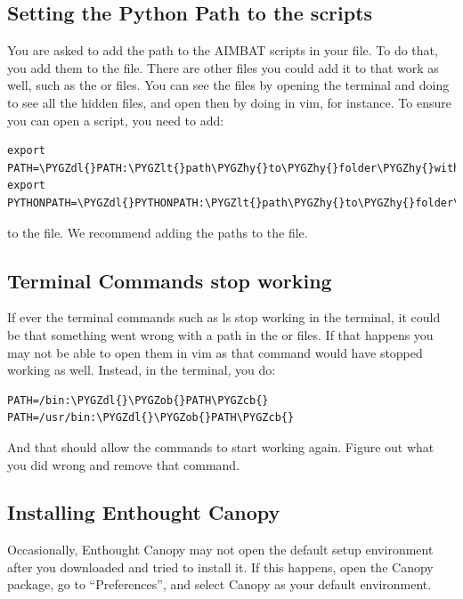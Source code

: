 \documentclass[letterpaper,10pt,english]{sphinxmanual}
\def\PYGZob{\char`\{}
\def\PYGZcb{\char`\}}
\def\PYGZlt{\char`\<}
\def\PYGZgt{\char`\>}
\def\PYGZdl{\char`\$}
\def\PYGZhy{\char`\-}
\begin{document}
\subsection{Setting the Python Path to the scripts}
\label{docfiles/install_dependencies:setting-the-python-path-to-the-scripts}
You are asked to add the path to the AIMBAT scripts in your file. To do that, you add them to the  file. There are other files you could add it to that work as well, such as the  or  files. You can see the files by opening the terminal and doing  to see all the hidden files, and open then by doing  in vim, for instance.
To ensure you can open a script, you need to add:

\begin{Verbatim}[commandchars=\\\{\}]
export PATH=\PYGZdl{}PATH:\PYGZlt{}path\PYGZhy{}to\PYGZhy{}folder\PYGZhy{}with\PYGZhy{}scripts\PYGZgt{}
export PYTHONPATH=\PYGZdl{}PYTHONPATH:\PYGZlt{}path\PYGZhy{}to\PYGZhy{}folder\PYGZhy{}with\PYGZhy{}scripts\PYGZgt{}
\end{Verbatim}

to the  file. We recommend adding the paths to the  file.


\subsection{Terminal Commands stop working}
\label{docfiles/install_dependencies:terminal-commands-stop-working}
If ever the terminal commands such as ls stop working in the terminal, it could be that something went wrong with a path in the  or  files. If that happens you may not be able to open them in vim as that command would have stopped working as well. Instead, in the terminal, you do:

\begin{Verbatim}[commandchars=\\\{\}]
PATH=/bin:\PYGZdl{}\PYGZob{}PATH\PYGZcb{}
PATH=/usr/bin:\PYGZdl{}\PYGZob{}PATH\PYGZcb{}
\end{Verbatim}

And that should allow the commands to start working again. Figure out what you did wrong and remove that command.


\subsection{Installing Enthought Canopy}
\label{docfiles/install_dependencies:installing-enthought-canopy}
Occasionally, Enthought Canopy may not open the default setup environment after you downloaded and tried to install it. If this happens, open the Canopy package, go to ``Preferences'', and select Canopy as your default environment.
\end{document}
